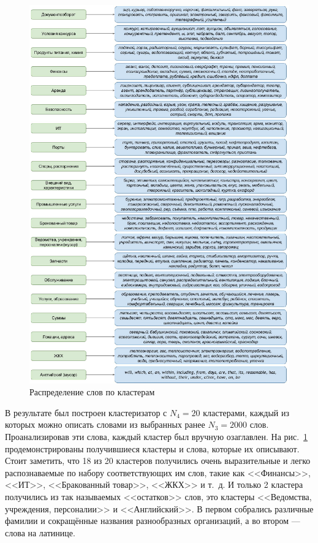 \documentclass[14pt]{matmex-diploma-custom}
\begin{document}
\begin{center}
	\begin{figure}[h!]
		\centering
		\includegraphics[scale=0.7]{images/im4.eps}
		\caption{Распределение слов по кластерам}
		\label{im4}
	\end{figure}
\end{center}

В результате был построен кластеризатор с $N_4 = 20$ кластерами, каждый из которых можно описать словами из выбранных ранее $N_3 = 2000$ слов. Проанализировав эти слова, каждый кластер был вручную озаглавлен. На рис.~\ref{im4} продемонстрированы получившиеся кластеры и слова, которые их описывают. Стоит заметить, что 18 из 20 кластеров получились очень выразительные и легко распознаваемые по набору соответствующих им слов, такие как <<Финансы>>, <<ИТ>>, <<Бракованный товар>>, <<ЖКХ>> и т.~д. И только 2 кластера получились из так называемых <<остатков>> слов, это кластеры <<Ведомства, учреждения, персоналии>> и <<Английский>>. В первом собрались различные фамилии и сокращённые названия разнообразных организаций, а во втором --- слова на латинице.
\end{document}
